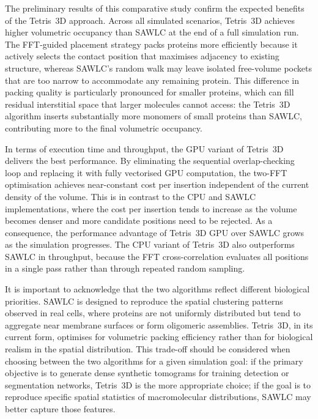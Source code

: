 The preliminary results of this comparative study confirm the expected benefits of the Tetris~3D
approach. Across all simulated scenarios, Tetris~3D achieves higher volumetric occupancy than
SAWLC at the end of a full simulation run. The FFT-guided placement strategy packs proteins more
efficiently because it actively selects the contact position that maximises adjacency to existing
structure, whereas SAWLC's random walk may leave isolated free-volume pockets that are too
narrow to accommodate any remaining protein. This difference in packing quality is particularly
pronounced for smaller proteins, which can fill residual interstitial space that larger molecules
cannot access: the Tetris~3D algorithm inserts substantially more monomers of small proteins than
SAWLC, contributing more to the final volumetric occupancy.

In terms of execution time and throughput, the GPU variant of Tetris~3D delivers the best
performance. By eliminating the sequential overlap-checking loop and replacing it with fully
vectorised GPU computation, the two-FFT optimisation achieves near-constant cost per insertion
independent of the current density of the volume. This is in contrast to the CPU and SAWLC
implementations, where the cost per insertion tends to increase as the volume becomes denser
and more candidate positions need to be rejected. As a consequence, the performance advantage of
Tetris~3D GPU over SAWLC grows as the simulation progresses. The CPU variant of Tetris~3D also
outperforms SAWLC in throughput, because the FFT cross-correlation evaluates all positions in
a single pass rather than through repeated random sampling.

It is important to acknowledge that the two algorithms reflect different biological priorities.
SAWLC is designed to reproduce the spatial clustering patterns observed in real cells, where
proteins are not uniformly distributed but tend to aggregate near membrane surfaces or form
oligomeric assemblies. Tetris~3D, in its current form, optimises for volumetric packing
efficiency rather than for biological realism in the spatial distribution. This trade-off should
be considered when choosing between the two algorithms for a given simulation goal: if the
primary objective is to generate dense synthetic tomograms for training detection or segmentation
networks, Tetris~3D is the more appropriate choice; if the goal is to reproduce specific spatial
statistics of macromolecular distributions, SAWLC may better capture those features.

